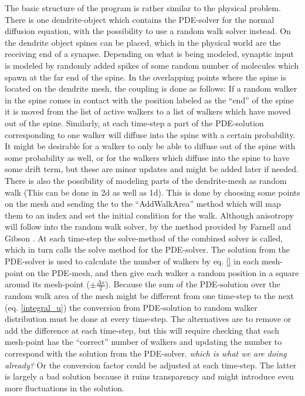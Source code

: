 The basic structure of the program is rather similar to the physical problem.
There is one dendrite-object which contains the PDE-solver for the normal diffusion equation, with the possibility to use a random walk solver instead. 
On the dendrite object spines can be placed, which in the physical world are the receiving end of a synapse. 
Depending on what is being modeled, synaptic input is modeled by randomly added spikes of some random number of molecules which spawn at the far end of the spine. 
In the overlapping points where the spine is located on the dendrite mesh, the coupling is done as follows: 
If a random walker in the spine comes in contact with the position labeled as the ``end'' of the spine it is moved from the list of active walkers to a list of walkers which have moved out of the spine. 
Similarly, at each time-step a part of the PDE-solution corresponding to one walker will diffuse into the spine with a certain probability. 
It might be desirable for a walker to only be able to diffuse out of the spine with some probability as well, or for the walkers which diffuse into the spine to have some drift term, but these are minor updates and might be added later if needed. \\

There is also the possibility of modeling parts of the dendrite-mesh as random walk (This can be done in 2d as well as 1d). 
This is done by choosing some points on the mesh and sending the to the ``AddWalkArea'' method which will map them to an index and set the initial condition for the walk. 
Although anisotropy will follow into the random walk solver, by the method provided by Farnell and Gibson \cite{farnell2005monte}. 
At each time-step the solve-method of the combined solver is called, which in turn calls the solve method for the PDE-solver. 
The solution from the PDE-solver is used to calculate the number of walkers by eq. \ref{} in each mesh-point on the PDE-mesh, and then give each walker a random position in a square around its mesh-point ($\pm \frac{\Delta x}{2}$). 
Because the sum of the PDE-solution over the random walk area of the mesh might be different from one time-step to the next (eq. \ref{integral_u}) the conversion from PDE-solution to random walker distribution must be done at every time-step. 
The alternatives are to remove or add the difference at each time-step, but this will require checking that each mesh-point has the ``correct'' number of walkers and updating the number to correspond with the solution from the PDE-solver. \emph{which is what we are doing already?}
Or the conversion factor could be adjusted at each time-step. The latter is largely a bad solution because it ruins transparency and might introduce even more fluctuations in the solution.

